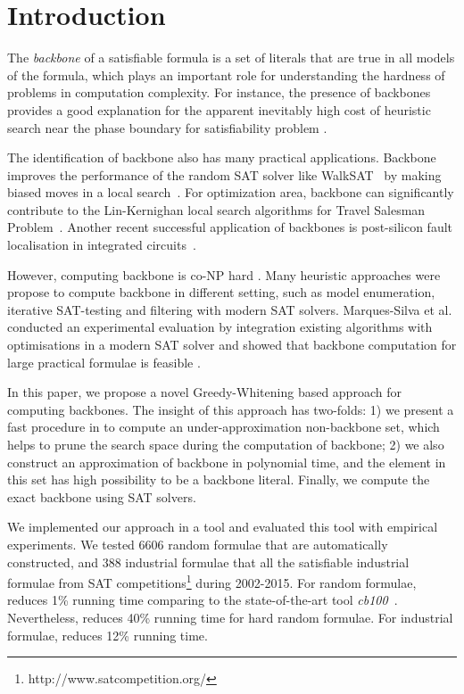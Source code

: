 

\section{Introduction}
The \textit{backbone} of a satisfiable formula is a set of literals that are true in all models of the formula,
which plays an important role for understanding the hardness of problems in computation complexity.
For instance, the presence of backbones provides a good explanation for the apparent inevitably high cost of heuristic search near the phase boundary  for satisfiability problem \cite{MZKST99}.

The identification of backbone also has many practical applications. Backbone improves the performance of the random SAT solver like  WalkSAT~\cite{SBK1993} by making biased moves in a local search~\cite{ZWR2003,MAR2007}. For optimization area,  backbone can significantly contribute to the Lin-Kernighan local search algorithms for Travel Salesman Problem~\cite{ZWL2005}. Another recent successful application of backbones is post-silicon fault localisation in integrated circuits~\cite{ZWSM11,ZWM11}.

However, computing backbone is co-NP hard \cite{Jan10}.  Many heuristic approaches were propose to compute backbone in different setting, such as model enumeration, iterative SAT-testing and filtering with modern SAT solvers.
Marques-Silva et al.  conducted an experimental evaluation by integration existing algorithms with optimisations in a modern SAT solver and showed that backbone computation for large practical formulae is feasible \cite{MJML2010,JLMS12,JLM15}.


In this paper, we propose a novel Greedy-Whitening based approach \tool for computing backbones. The insight of this approach has two-folds: 1) we present a fast procedure in to compute an under-approximation non-backbone set, which helps to prune the search space during the computation of backbone; 2) we also construct an approximation of backbone in polynomial time, and the element in this set has high possibility to be a backbone literal.
Finally, we compute the exact backbone using SAT solvers.

We implemented our approach in a tool \tool and evaluated this tool with empirical experiments. We tested 6606 random formulae that are automatically constructed, and 388 industrial formulae that all the satisfiable industrial formulae from SAT competitions\footnote{http://www.satcompetition.org/} during 2002-2015. For random formulae, \tool reduces 1\% running time comparing to the state-of-the-art tool \textit{cb100}~\cite{JLM15}. Nevertheless, \tool reduces 40\% running time for hard random formulae. For industrial formulae, \tool reduces 12\% running time.


